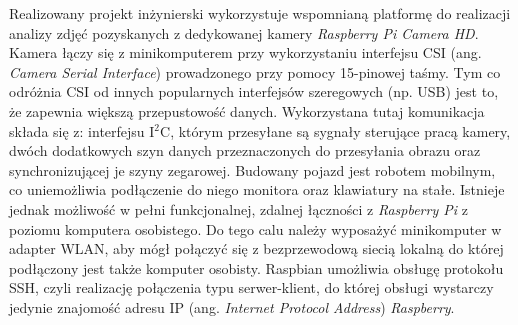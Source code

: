 Realizowany projekt inżynierski wykorzystuje wspomnianą platformę do realizacji analizy zdjęć pozyskanych z dedykowanej kamery \textit{Raspberry Pi Camera HD}. Kamera łączy się z minikomputerem przy wykorzystaniu interfejsu CSI (ang. \textit{Camera Serial Interface}) prowadzonego przy pomocy 15-pinowej taśmy. Tym co odróżnia CSI od innych popularnych interfejsów szeregowych (np. USB) jest to, że zapewnia większą przepustowość danych. Wykorzystana tutaj komunikacja składa się z: interfejsu I$^2$C, którym przesyłane są sygnały sterujące pracą kamery, dwóch dodatkowych szyn danych przeznaczonych do przesyłania obrazu oraz synchronizującej je szyny zegarowej. 
Budowany pojazd jest robotem mobilnym, co uniemożliwia podłączenie do niego monitora oraz klawiatury na stałe. Istnieje jednak możliwość w pełni funkcjonalnej, zdalnej łączności z \textit{Raspberry Pi} z poziomu komputera osobistego. Do tego calu należy wyposażyć minikomputer w adapter WLAN, aby mógł połączyć się z bezprzewodową siecią lokalną do której podłączony jest także komputer osobisty. Raspbian umożliwia obsługę protokołu SSH, czyli realizację połączenia typu serwer-klient, do której obsługi wystarczy jedynie znajomość adresu IP (ang. \textit{Internet Protocol Address}) \textit{Raspberry}.
  
